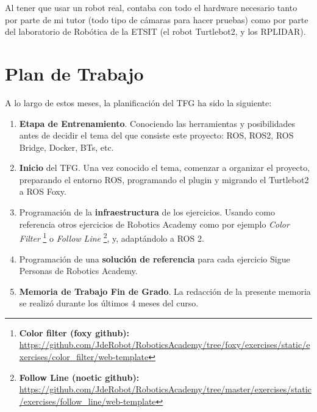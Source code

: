 Al tener que usar un robot real, contaba con todo el hardware necesario tanto por parte de mi tutor (todo tipo de cámaras para hacer pruebas) como por parte del laboratorio de Robótica de la ETSIT (el robot Turtlebot2, y los RPLIDAR).


\section{Plan de Trabajo}
\label{sec:plan_trabajo}
A lo largo de estos meses, la planificación del TFG ha sido la siguiente:

\begin{enumerate}
	\item \textbf{Etapa de Entrenamiento}. Conociendo las herramientas y posibilidades antes de decidir el tema del que consiste este proyecto: ROS, ROS2, ROS Bridge, Docker, BTs, etc.
	\item \textbf{Inicio} del TFG. Una vez conocido el tema, comenzar a organizar el proyecto, preparando el entorno ROS, programando el plugin y migrando el Turtlebot2 a ROS Foxy.
	\item Programación de la \textbf{infraestructura} de los ejercicios. Usando como referencia otros ejercicios de Robotics Academy como por ejemplo \textit{Color Filter} \footnote{\textbf{Color filter (foxy github):} \url{https://github.com/JdeRobot/RoboticsAcademy/tree/foxy/exercises/static/exercises/color_filter/web-template}} o \textit{Follow Line} \footnote{\textbf{Follow Line (noetic github):} \url{https://github.com/JdeRobot/RoboticsAcademy/tree/master/exercises/static/exercises/follow_line/web-template}}, y, adaptándolo a ROS 2.
	\item Programación de una \textbf{solución de referencia} para cada ejercicio Sigue Personas de Robotics Academy.
	\item \textbf{Memoria de Trabajo Fin de Grado}. La redacción de la presente memoria se realizó durante los últimos 4 meses del curso. 
\end{enumerate}


